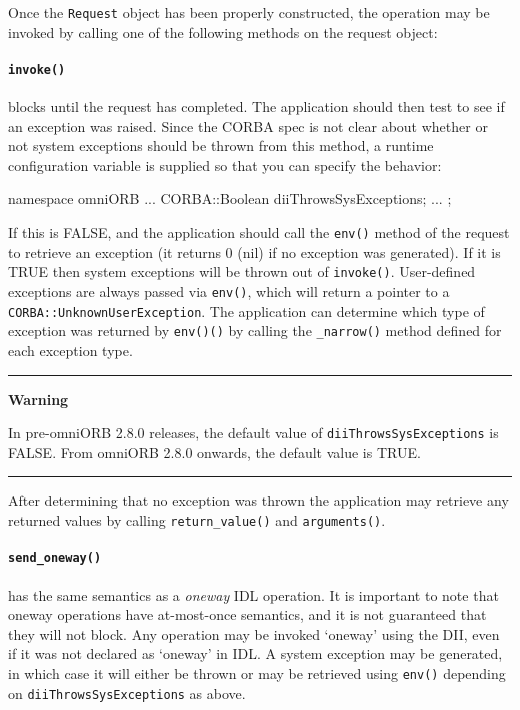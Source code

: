 \documentclass[11pt,twoside,a4paper]{book}
\newcommand{\type}[1]{\texttt{#1}}
\newcommand{\code}[1]{\texttt{#1}}
\newcommand{\op}[1]{\texttt{#1()}}
\newenvironment{statement}%
 {\noindent\begin{minipage}{\textwidth}%
  \vspace{.5\baselineskip}%
  \noindent\rule{\textwidth}{2pt}%
  \vspace{.25\baselineskip}%
  \begin{list}{}{\setlength{\listparindent}{0em}%
                 \setlength{\itemindent}{0em}%
                 \setlength{\leftmargin}{1.5em}%
                 \setlength{\rightmargin}{\leftmargin}%
                 \setlength{\topsep}{0pt}%
                 \setlength{\partopsep}{0pt}}
  \item\relax}
 {\end{list}%
  \vspace{-.25\baselineskip}%
  \noindent\rule{\textwidth}{2pt}%
  \vspace{.5\baselineskip}%
  \end{minipage}}
\begin{document}
Once the \type{Request} object has been properly constructed, the
operation may be invoked by calling one of the following methods on
the request object:

\paragraph{\op{invoke}}

blocks until the request has completed. The application should then
test to see if an exception was raised. Since the CORBA spec is not
clear about whether or not system exceptions should be thrown from
this method, a runtime configuration variable is supplied so that you
can specify the behavior:

\begin{cxxlisting}
namespace omniORB {
  ...
  CORBA::Boolean diiThrowsSysExceptions;
  ...
};
\end{cxxlisting}

If this is FALSE, and the application should call the \op{env} method
of the request to retrieve an exception (it returns 0 (nil) if no
exception was generated). If it is TRUE then system exceptions will be
thrown out of \op{invoke}. User-defined exceptions are always passed
via \op{env}, which will return a pointer to a
\type{CORBA::UnknownUserException}.  The application can determine
which type of exception was returned by \op{env()} by calling the
\op{\_narrow} method defined for each exception type.

\begin{statement}
\centerline{\textbf{Warning}}

In pre-omniORB 2.8.0 releases, the default value of
\code{diiThrowsSysExceptions} is FALSE. From omniORB 2.8.0 onwards,
the default value is TRUE.

\end{statement}

After determining that no exception was thrown the application may
retrieve any returned values by calling \op{return\_value} and
\op{arguments}.

\paragraph{\op{send\_oneway}}

has the same semantics as a \emph{oneway} IDL operation. It is
important to note that oneway operations have at-most-once semantics,
and it is not guaranteed that they will not block. Any operation may
be invoked `oneway' using the DII, even if it was not declared as
`oneway' in IDL. A system exception may be generated, in which case it
will either be thrown or may be retrieved using \op{env} depending on
\code{diiThrowsSysExceptions} as above.
\end{document}
